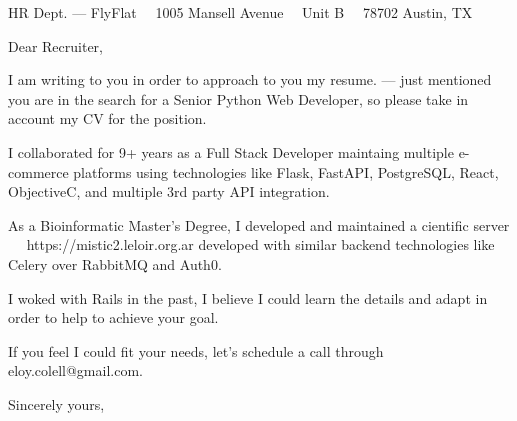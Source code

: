 \documentclass{scrlttr2}
\renewcommand{\\}{\ {\large\textperiodcentered}\ }
\begin{document}

\begin{letter}{ %
HR Dept. --- FlyFlat\\
1005 Mansell Avenue\\
Unit B\\
78702 Austin, TX
}


\opening{Dear Recruiter,}

I am writing to you in order to approach to you my resume. --- just mentioned you are in the search for a Senior Python Web Developer, so please take in account my CV for the position.\\

I collaborated for 9+ years as a Full Stack Developer maintaing multiple e-commerce platforms using technologies like Flask, FastAPI, PostgreSQL, React, ObjectiveC, and multiple 3rd party API integration.\\

As a Bioinformatic Master's Degree, I developed and maintained a cientific server \\ https://mistic2.leloir.org.ar developed with similar backend technologies like Celery over RabbitMQ and Auth0.\\

I woked with Rails in the past, I believe I could learn the details and adapt in order to help to achieve your goal.\\

If you feel I could fit your needs, let's schedule a call through eloy.colell@gmail.com.\\

Sincerely yours, \\ \\ \\


\end{letter}
\end{document}
